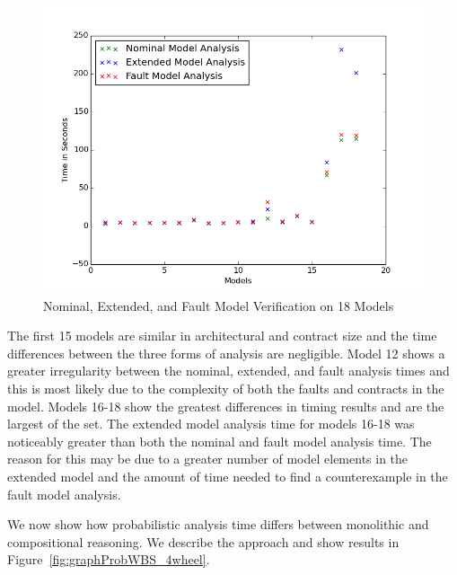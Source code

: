 \begin{figure}[htbp]
	\begin{center}
		\includegraphics[width=.7\textwidth]{images/graphComp15Models.png}
	\end{center}
	\vspace{-0.3in}
	\caption{Nominal, Extended, and Fault Model Verification on 18 Models}
	\label{fig:graphComp15Models}
\end{figure}

The first 15 models are similar in architectural and contract size and the time differences between the three forms of analysis are negligible. Model 12 shows a greater irregularity between the nominal, extended, and fault analysis times and this is most likely due to the complexity of both the faults and contracts in the model. Models 16-18 show the greatest differences in timing results and are the largest of the set. The extended model analysis time for models 16-18 was noticeably greater than both the nominal and fault model analysis time. The reason for this may be due to a greater number of model elements in the extended model and the amount of time needed to find a counterexample in the fault model analysis.

We now show how probabilistic analysis time differs between monolithic and compositional reasoning. We describe the approach and show results in Figure~\ref{fig:graphProbWBS_4wheel}. 

